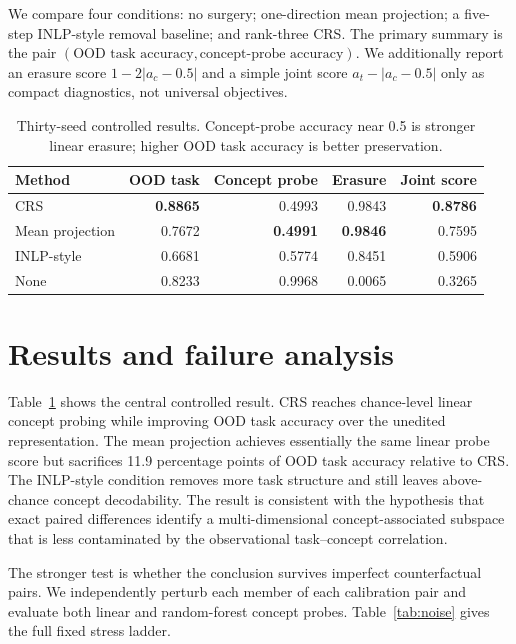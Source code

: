 \documentclass{article}
\begin{document}
We compare four conditions: no surgery; one-direction mean projection; a five-step INLP-style removal baseline; and rank-three CRS. The primary summary is the pair $(\text{OOD task accuracy},\text{concept-probe accuracy})$. We additionally report an erasure score $1-2|a_c-0.5|$ and a simple joint score $a_t-|a_c-0.5|$ only as compact diagnostics, not universal objectives.

\begin{table}[t]
\centering
\caption{Thirty-seed controlled results. Concept-probe accuracy near 0.5 is stronger linear erasure; higher OOD task accuracy is better preservation.}
\small
\begin{tabular}{lrrrr}
\toprule
Method & OOD task & Concept probe & Erasure & Joint score\\
\midrule
CRS & \textbf{0.8865} & 0.4993 & 0.9843 & \textbf{0.8786}\\
Mean projection & 0.7672 & \textbf{0.4991} & \textbf{0.9846} & 0.7595\\
INLP-style & 0.6681 & 0.5774 & 0.8451 & 0.5906\\
None & 0.8233 & 0.9968 & 0.0065 & 0.3265\\
\bottomrule
\end{tabular}
\label{tab:main}
\end{table}

\section{Results and failure analysis}
Table~\ref{tab:main} shows the central controlled result. CRS reaches chance-level linear concept probing while improving OOD task accuracy over the unedited representation. The mean projection achieves essentially the same linear probe score but sacrifices 11.9 percentage points of OOD task accuracy relative to CRS. The INLP-style condition removes more task structure and still leaves above-chance concept decodability. The result is consistent with the hypothesis that exact paired differences identify a multi-dimensional concept-associated subspace that is less contaminated by the observational task--concept correlation.

The stronger test is whether the conclusion survives imperfect counterfactual pairs. We independently perturb each member of each calibration pair and evaluate both linear and random-forest concept probes. Table~\ref{tab:noise} gives the full fixed stress ladder.
\end{document}
